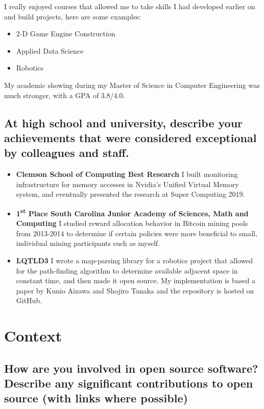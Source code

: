 \documentclass{article}
\begin{document}
I really enjoyed courses that allowed me to take skills I had developed earlier on and build projects, here are some examples:
\begin{itemize}
    \item 2-D Game Engine Construction
    \item Applied Data Science
    \item Robotics
\end{itemize}

My academic showing during my Master of Science in Computer Engineering was much stronger, with a GPA of 3.8/4.0.

\subsection{At high school and university, describe your achievements that were
    considered exceptional by colleagues and staff.}

\begin{itemize}
    \item \textbf{Clemson School of Computing Best Research}  I built monitoring infrastructure for
          memory accesses in Nvidia's Unified Virtual Memory system, and eventually
          presented the research at Super Computing 2019.
    \item \textbf{1\textsuperscript{st} Place South Carolina Junior Academy of Sciences, Math
              and Computing} I studied reward allocation behavior in Bitcoin mining pools
          from 2013-2014 to determine if certain policies were more beneficial to
          small, individual mining participants such as myself.
    \item \textbf{LQTLD3} I wrote a map-parsing library for a robotics project
          that allowed for the path-finding algorithm to determine available adjacent
          space in constant time, and then made it open source. My implementation is based
          a paper by Kunio Aizawa and Shojiro Tanaka\cite{4538229} and the repository is hosted
          on GitHub\cite{lqtld3}.

\end{itemize}
\section{Context}
\subsection{How are you involved in open source software? Describe any
    significant contributions to open source (with links where possible)}
\end{document}
